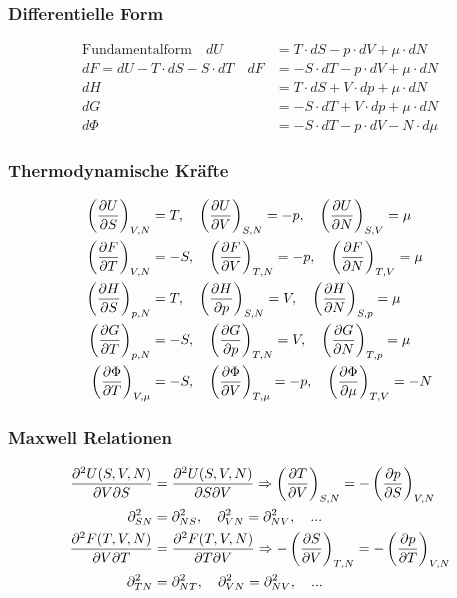 \subsubsection{Differentielle Form}
\begin{align}
    \text{Fundamentalform} \quad dU &= T \cdot dS - p\cdot dV + \mu \cdot dN\\
    dF = dU - T \cdot dS - S \cdot dT \quad dF &= -S \cdot dT - p\cdot dV + \mu \cdot dN\\
    dH &= T \cdot dS + V\cdot dp + \mu \cdot dN \\
    dG &= -S \cdot dT + V \cdot dp + \mu \cdot dN \\
    d\Phi &= -S \cdot dT - p\cdot dV - N \cdot d\mu
\end{align}
    
\subsubsection{Thermodynamische Kräfte}
\begin{align}
    \left(\pdv{U}{S}\right)_{V,N} &= T, \quad \left(\pdv{U}{V}\right)_{S,N} = -p, \quad \left(\pdv{U}{N}\right)_{S,V} = \mu \\
    \left(\pdv{F}{T}\right)_{V,N} &= -S, \quad \left(\pdv{F}{V}\right)_{T,N} = -p, \quad \left(\pdv{F}{N}\right)_{T,V} = \mu \\
    \left(\pdv{H}{S}\right)_{p,N} &= T, \quad \left(\pdv{H}{p}\right)_{S,N} = V, \quad \left(\pdv{H}{N}\right)_{S,p} = \mu \\
    \left(\pdv{G}{T}\right)_{p,N} &= -S, \quad \left(\pdv{G}{p}\right)_{T,N} = V, \quad \left(\pdv{G}{N}\right)_{T,p} = \mu \\
    \left(\pdv{\Phi}{T}\right)_{V,\mu} &= -S, \quad \left(\pdv{\Phi}{V}\right)_{T,\mu} = -p, \quad \left(\pdv{\Phi}{\mu}\right)_{T,V} = -N
\end{align}

\subsubsection{Maxwell Relationen}
\begin{align}
    \frac{\partial^2 U(S,V,N)}{\partial V \partial S} &=\frac{\partial^2 U(S,V,N)}{\partial S\partial V} \Rightarrow \left(\pdv{T}{V}\right)_{S,N} = - \left(\pdv{p}{S}\right)_{V,N}\\
    \partial_{SN}^2 &= \partial_{NS}^2, \quad \partial_{VN}^2 = \partial_{NV}^2, \quad ...\\
    \frac{\partial^2 F(T,V,N)}{\partial V \partial T} &=\frac{\partial^2 F(T,V,N)}{\partial T\partial V} \Rightarrow -\left(\pdv{S}{V}\right)_{T,N} = - \left(\pdv{p}{T}\right)_{V,N}\\
    \partial_{TN}^2 &= \partial_{NT}^2, \quad \partial_{VN}^2 = \partial_{NV}^2, \quad ...
\end{align}

